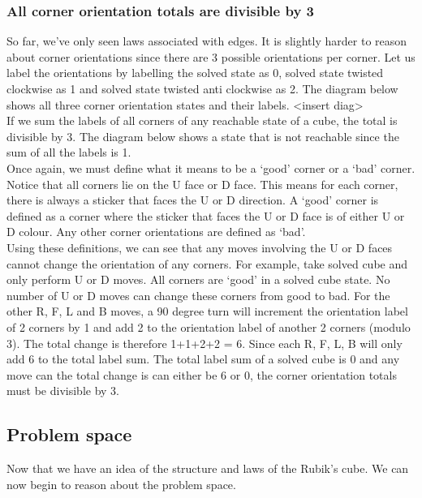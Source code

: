 \documentclass[titlepage]{report}[12pt]
\begin{document}
\subsubsection{All corner orientation totals are divisible by 3}
So far, we've only seen laws associated with edges. It is slightly harder to reason about corner orientations since there are 3 possible orientations per corner. Let us label the orientations by labelling the solved state as 0, solved state twisted clockwise as 1 and solved state twisted anti clockwise as 2. The diagram below shows all three corner orientation states and their labels. <insert diag>
\\
\indent
If we sum the labels of all corners of any reachable state of a cube, the total is divisible by 3. The diagram below shows a state that is not reachable since the sum of all the labels is 1.
\\
\indent
Once again, we must define what it means to be a `good' corner or a `bad' corner. Notice that all corners lie on the U face or D face. This means for each corner, there is always a sticker that faces the U or D direction. A `good' corner is defined as a corner where the sticker that faces the U or D face is of either U or D colour. Any other corner orientations are defined as `bad'. 
\\
\indent
Using these definitions, we can see that any moves involving the U or D faces cannot change the orientation of any corners. For example, take solved cube and only perform U or D moves. All corners are `good' in a solved cube state. No number of U or D moves can change these corners from good to bad. For the other R, F, L and B moves, a 90 degree turn will increment the orientation label of 2 corners by 1 and add 2 to the orientation label of another 2 corners (modulo 3). The total change is therefore 1+1+2+2 = 6. Since each R, F, L, B will only add 6 to the total label sum. The total label sum of a solved cube is 0 and any move can the total change is can either be 6 or 0, the corner orientation totals must be divisible by 3.

\subsection{Problem space}
Now that we have an idea of the structure and laws of the Rubik's cube. We can now begin to reason about the problem space.
\end{document}
